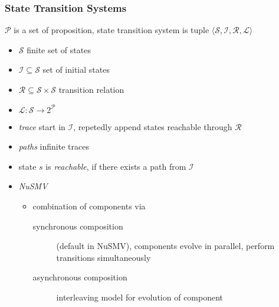 \documentclass[a4paper, 10pt]{article}
\begin{document}
\subsubsection*{State Transition Systems}
\begin{shaded}
    $\mathcal{P}$ is a set of proposition, state transition system is tuple $\langle \mathcal{S}, \mathcal{I}, \mathcal{R}, \mathcal{L}\rangle$
    \begin{itemize}
        \item $\mathcal{S}$ finite set of states
        \item $\mathcal{I} \subseteq \mathcal{S}$ set of initial states
        \item $\mathcal{R} \subseteq \mathcal{S} \times \mathcal{S}$ transition relation
        \item $\mathcal{L}:\mathcal{S}\longrightarrow 2^\mathcal{P}$
    \end{itemize}
\end{shaded}
\begin{itemize}
    \item \emph{trace} start in $\mathcal{I}$, repetedly append states reachable through $\mathcal{R}$
    \item \emph{paths} infinite traces
    \item state $s$ is \emph{reachable}, if there exists a path from $\mathcal{I}$
    \item \emph{NuSMV}
    \begin{itemize}
        \item combination of components via
        \begin{description}
            \item[synchronous composition] (default in NuSMV), components evolve in parallel, perform transitions simultaneously
            \item[asynchronous composition] interleaving model for evolution of component
        \end{description}
    \end{itemize}
\end{itemize}
\end{document}
